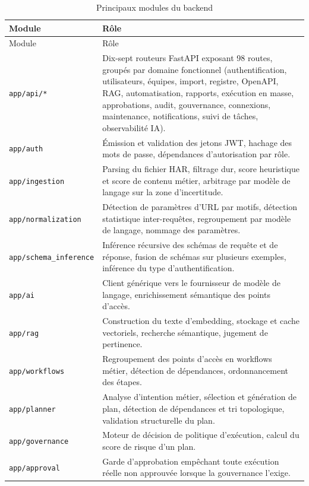 \begin{longtable}{L{4cm}Y}
  \caption{Principaux modules du backend} \label{tab:modules-backend} \\
  Module & Rôle \\
  \hline
  \endfirsthead
  Module & Rôle \\
  \hline
  \endhead
  \texttt{app/api/*} & Dix-sept routeurs FastAPI exposant 98 routes, groupés par domaine fonctionnel (authentification, utilisateurs, équipes, import, registre, OpenAPI, RAG, automatisation, rapports, exécution en masse, approbations, audit, gouvernance, connexions, maintenance, notifications, suivi de tâches, observabilité IA). \\ \hline
  \texttt{app/auth} & Émission et validation des jetons JWT, hachage des mots de passe, dépendances d'autorisation par rôle. \\ \hline
  \texttt{app/ingestion} & Parsing du fichier HAR, filtrage dur, score heuristique et score de contenu métier, arbitrage par modèle de langage sur la zone d'incertitude. \\ \hline
  \texttt{app/normalization} & Détection de paramètres d'URL par motifs, détection statistique inter-requêtes, regroupement par modèle de langage, nommage des paramètres. \\ \hline
  \texttt{app/schema\_inference} & Inférence récursive des schémas de requête et de réponse, fusion de schémas sur plusieurs exemples, inférence du type d'authentification. \\ \hline
  \texttt{app/ai} & Client générique vers le fournisseur de modèle de langage, enrichissement sémantique des points d'accès. \\ \hline
  \texttt{app/rag} & Construction du texte d'embedding, stockage et cache vectoriels, recherche sémantique, jugement de pertinence. \\ \hline
  \texttt{app/workflows} & Regroupement des points d'accès en workflows métier, détection de dépendances, ordonnancement des étapes. \\ \hline
  \texttt{app/planner} & Analyse d'intention métier, sélection et génération de plan, détection de dépendances et tri topologique, validation structurelle du plan. \\ \hline
  \texttt{app/governance} & Moteur de décision de politique d'exécution, calcul du score de risque d'un plan. \\ \hline
  \texttt{app/approval} & Garde d'approbation empêchant toute exécution réelle non approuvée lorsque la gouvernance l'exige. \\ \hline

\end{longtable}
